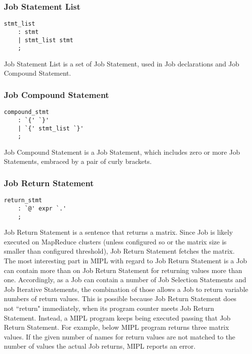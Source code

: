 \documentclass[prodmode,acmtecs]{acmsmall}
\begin{document}
\subsubsection{Job Statement List}

\begin{lstlisting}
stmt_list
	: stmt
	| stmt_list stmt
	;
\end{lstlisting}

Job Statement List is a set of Job Statement, used in Job
declarations and Job Compound Statement.
\medskip


\subsubsection{Job Compound Statement}

\begin{lstlisting}
compound_stmt
	: `{' `}'
	| `{' stmt_list `}'
	;
\end{lstlisting}

Job Compound Statement is a Job Statement, which includes
zero or more Job Statements, embraced by a pair of curly
brackets.
\medskip

\subsubsection{Job Return Statement}

\begin{lstlisting}
return_stmt
	: `@' expr `.'
	;

\end{lstlisting}

Job Return Statement is a sentence that returns a matrix.  Since
Job is likely executed on MapReduce clusters (unless configured
so or the matrix size is smaller than configured threshold), Job
Return Statement fetches the matrix.  The most interesting part
in MIPL with regard to Job Return Statement is a Job can contain
more than on Job Return Statement for returning values more than
one.  Accordingly, as a Job can contain a number of Job Selection
Statements and Job Iterative Statements, the combination of those
allows a Job to return variable numbers of return values. This is
possible because Job Return Statement does not ``return" immediately,
when its program counter meets Job Return Statement.  Instead, a
MIPL program keeps being executed passing that Job Return Statement.
For example, below MIPL program returns three matrix values.  If
the given number of names for return values are not matched to the
number of values the actual Job returns, MIPL reports an error.
\end{document}
